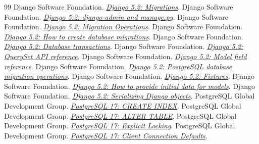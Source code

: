 \documentclass[11pt,a4paper]{article}
\begin{document}
\clearpage
\renewcommand{\refname}{Библиография и первичные источники}
\begin{thebibliography}{99}
\fontsize{9.2}{11}\selectfont
\setlength{\itemsep}{4pt}
 Django Software Foundation. \href{https://docs.djangoproject.com/en/5.2/topics/migrations/}{\textit{Django 5.2: Migrations}}.
 Django Software Foundation. \href{https://docs.djangoproject.com/en/5.2/ref/django-admin/}{\textit{Django 5.2: django-admin and manage.py}}.
 Django Software Foundation. \href{https://docs.djangoproject.com/en/5.2/ref/migration-operations/}{\textit{Django 5.2: Migration Operations}}.
 Django Software Foundation. \href{https://docs.djangoproject.com/en/5.2/howto/writing-migrations/}{\textit{Django 5.2: How to create database migrations}}.
 Django Software Foundation. \href{https://docs.djangoproject.com/en/5.2/topics/db/transactions/}{\textit{Django 5.2: Database transactions}}.
 Django Software Foundation. \href{https://docs.djangoproject.com/en/5.2/ref/models/querysets/}{\textit{Django 5.2: QuerySet API reference}}.
 Django Software Foundation. \href{https://docs.djangoproject.com/en/5.2/ref/models/fields/}{\textit{Django 5.2: Model field reference}}.
 Django Software Foundation. \href{https://docs.djangoproject.com/en/5.2/ref/contrib/postgres/operations/}{\textit{Django 5.2: PostgreSQL database migration operations}}.
 Django Software Foundation. \href{https://docs.djangoproject.com/en/5.2/topics/db/fixtures/}{\textit{Django 5.2: Fixtures}}.
 Django Software Foundation. \href{https://docs.djangoproject.com/en/5.2/howto/initial-data/}{\textit{Django 5.2: How to provide initial data for models}}.
 Django Software Foundation. \href{https://docs.djangoproject.com/en/5.2/topics/serialization/}{\textit{Django 5.2: Serializing Django objects}}.
 PostgreSQL Global Development Group. \href{https://www.postgresql.org/docs/17/sql-createindex.html}{\textit{PostgreSQL 17: CREATE INDEX}}.
 PostgreSQL Global Development Group. \href{https://www.postgresql.org/docs/17/sql-altertable.html}{\textit{PostgreSQL 17: ALTER TABLE}}.
 PostgreSQL Global Development Group. \href{https://www.postgresql.org/docs/17/explicit-locking.html}{\textit{PostgreSQL 17: Explicit Locking}}.
 PostgreSQL Global Development Group. \href{https://www.postgresql.org/docs/17/runtime-config-client.html}{\textit{PostgreSQL 17: Client Connection Defaults}}.

\end{thebibliography}
\end{document}
